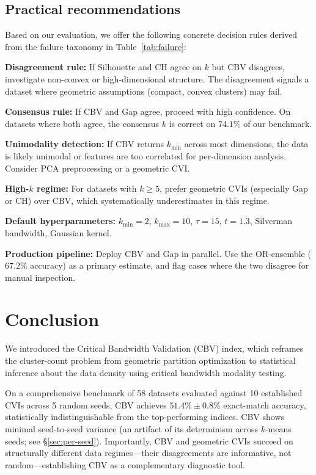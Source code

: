 \documentclass[journal]{IEEEtran}
\begin{document}
\subsection{Practical recommendations}
\label{sec:recommendations}

Based on our evaluation, we offer the following concrete decision rules derived from the failure taxonomy in Table~\ref{tab:failure}:

\textbf{Disagreement rule:} If Silhouette and CH agree on $k$ but CBV disagrees, investigate non-convex or high-dimensional structure. The disagreement signals a dataset where geometric assumptions (compact, convex clusters) may fail.

\textbf{Consensus rule:} If CBV and Gap agree, proceed with high confidence. On datasets where both agree, the consensus $k$ is correct on $74.1\%$ of our benchmark.

\textbf{Unimodality detection:} If CBV returns $k_{\min}$ across most dimensions, the data is likely unimodal or features are too correlated for per-dimension analysis. Consider PCA preprocessing or a geometric CVI.

\textbf{High-$k$ regime:} For datasets with $k \geq 5$, prefer geometric CVIs (especially Gap or CH) over CBV, which systematically underestimates in this regime.

\textbf{Default hyperparameters:} $k_{\min} = 2$, $k_{\max} = 10$, $\tau = 15$, $t = 1.3$, Silverman bandwidth, Gaussian kernel.

\textbf{Production pipeline:} Deploy CBV and Gap in parallel. Use the OR-ensemble ($67.2\%$ accuracy) as a primary estimate, and flag cases where the two disagree for manual inspection.

\section{Conclusion}
\label{sec:conclusion}

We introduced the Critical Bandwidth Validation (CBV) index, which reframes the cluster-count problem from geometric partition optimization to statistical inference about the data density using critical bandwidth modality testing.

On a comprehensive benchmark of 58 datasets evaluated against 10 established CVIs across 5 random seeds, CBV achieves $51.4\% \pm 0.8\%$ exact-match accuracy, statistically indistinguishable from the top-performing indices. CBV shows minimal seed-to-seed variance (an artifact of its determinism across $k$-means seeds; see \S\ref{sec:per-seed}). Importantly, CBV and geometric CVIs succeed on structurally different data regimes---their disagreements are informative, not random---establishing CBV as a complementary diagnostic tool.
\end{document}
